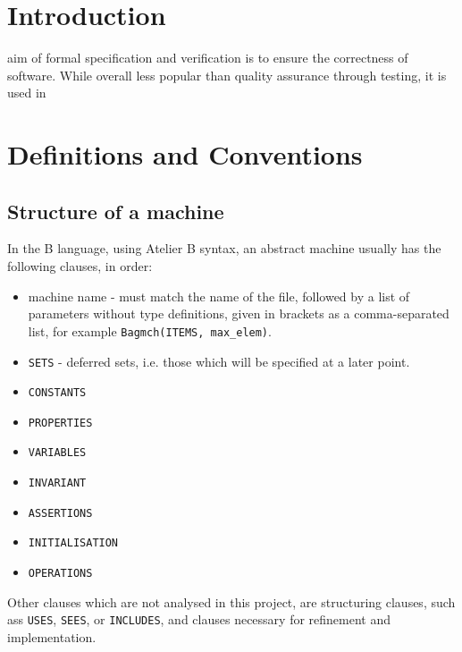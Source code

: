 \documentclass[11pt,journal]{IEEEtran}
\begin{document}
	
	\IEEEpeerreviewmaketitle
	
	
	
	\section{Introduction}
	 aim of formal specification and verification is to ensure the correctness of software. While overall less popular than quality assurance through testing, it is used in 
	
	\section{Definitions and Conventions}
	\subsection{Structure of a machine}
	In the B language, using Atelier B syntax, an abstract machine usually has the following clauses, in order:
	\begin{itemize}
		\item machine name - must match the name of the file, followed by a list of parameters without type definitions, given in brackets as a comma-separated list, for example \texttt{Bagmch(ITEMS, max\_elem)}.
		\item \texttt{SETS} - deferred sets, i.e. those which will be specified at a later point. 
		\item \texttt{CONSTANTS}
		\item \texttt{PROPERTIES}
		\item \texttt{VARIABLES}
		\item \texttt{INVARIANT}
		\item \texttt{ASSERTIONS}
		\item \texttt{INITIALISATION}
		\item \texttt{OPERATIONS}
	\end{itemize}
	Other clauses which are not analysed in this project, are structuring clauses, such ass \texttt{USES}, \texttt{SEES}, or \texttt{INCLUDES}, and clauses necessary for refinement and implementation.
	
\end{document}
